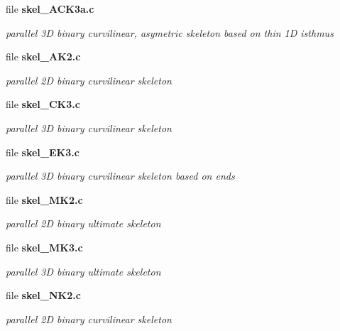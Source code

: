 \begin{CompactItemize}
\item 
file {\bf skel\_\-ACK3a.c}
\begin{CompactList}\small\item\em parallel 3D binary curvilinear, asymetric skeleton based on thin 1D isthmus \item\end{CompactList}

\item 
file {\bf skel\_\-AK2.c}
\begin{CompactList}\small\item\em parallel 2D binary curvilinear skeleton \item\end{CompactList}

\item 
file {\bf skel\_\-CK3.c}
\begin{CompactList}\small\item\em parallel 3D binary curvilinear skeleton \item\end{CompactList}

\item 
file {\bf skel\_\-EK3.c}
\begin{CompactList}\small\item\em parallel 3D binary curvilinear skeleton based on ends \item\end{CompactList}

\item 
file {\bf skel\_\-MK2.c}
\begin{CompactList}\small\item\em parallel 2D binary ultimate skeleton \item\end{CompactList}

\item 
file {\bf skel\_\-MK3.c}
\begin{CompactList}\small\item\em parallel 3D binary ultimate skeleton \item\end{CompactList}

\item 
file {\bf skel\_\-NK2.c}
\begin{CompactList}\small\item\em parallel 2D binary curvilinear skeleton \item\end{CompactList}


\end{CompactItemize}
